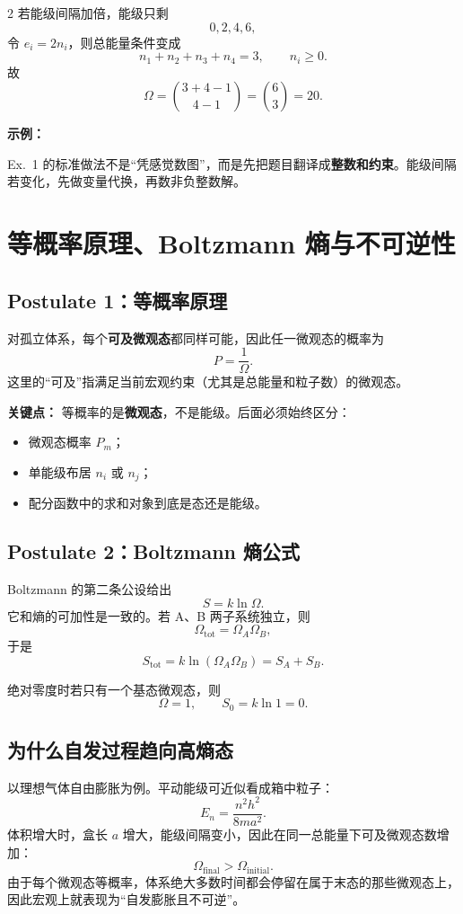 \documentclass[a4paper,9pt]{article}
\newenvironment{keypoint}
{\par\vspace{0.3em}\noindent\begin{tcolorbox}[
  colback=keybg,
  colframe=keycolor,
  boxrule=0.5pt,
  arc=2pt,
  left=2pt,
  right=2pt,
  top=2pt,
  bottom=2pt,
  boxsep=0pt,
  ]
\noindent\textcolor{keycolor}{\textbf{关键点：}}}
{\end{tcolorbox}\par\vspace{0.3em}}
\newenvironment{examplebox}
{\par\vspace{0.3em}\noindent\begin{tcolorbox}[
  colback=boxbg,
  colframe=derivcolor,
  boxrule=0.5pt,
  arc=2pt,
  left=2pt,
  right=2pt,
  top=2pt,
  bottom=2pt,
  boxsep=0pt,
  ]
\scriptsize\noindent\textcolor{derivcolor}{\textbf{示例：}}\par
\setlength{\parskip}{0.1ex}\setlength{\itemsep}{0pt}\setlength{\parsep}{0pt}}
{\end{tcolorbox}\par\vspace{0.3em}}
\begin{document}
\begin{multicols}{2}
	若能级间隔加倍，能级只剩
	\[
		0,2,4,6,
	\]
	令 $e_i=2n_i$，则总能量条件变成
	\[
		n_1+n_2+n_3+n_4=3,
		\qquad n_i\ge 0.
	\]
	故
	\[
		\Omega=\binom{3+4-1}{4-1}=\binom63=20.
	\]

	\begin{examplebox}
		Ex.~1 的标准做法不是“凭感觉数图”，而是先把题目翻译成\textbf{整数和约束}。能级间隔若变化，先做变量代换，再数非负整数解。
	\end{examplebox}

	\section{等概率原理、Boltzmann 熵与不可逆性}

	\subsection{Postulate 1：等概率原理}
	对孤立体系，每个\textbf{可及微观态}都同样可能，因此任一微观态的概率为
	\[
		P=\frac1\Omega.
	\]
	这里的“可及”指满足当前宏观约束（尤其是总能量和粒子数）的微观态。

	\begin{keypoint}
		等概率的是\textbf{微观态}，不是能级。后面必须始终区分：
		\begin{itemize}
			\item 微观态概率 $P_m$；
			\item 单能级布居 $n_i$ 或 $n_j$；
			\item 配分函数中的求和对象到底是态还是能级。
		\end{itemize}
	\end{keypoint}

	\subsection{Postulate 2：Boltzmann 熵公式}
	Boltzmann 的第二条公设给出
	\[
		S=k\ln\Omega.
	\]
	它和熵的可加性是一致的。若 A、B 两子系统独立，则
	\[
		\Omega_{\mathrm{tot}}=\Omega_A\Omega_B,
	\]
	于是
	\[
		S_{\mathrm{tot}}=k\ln(\Omega_A\Omega_B)=S_A+S_B.
	\]

	绝对零度时若只有一个基态微观态，则
	\[
		\Omega=1,
		\qquad S_0=k\ln 1=0.
	\]

	\subsection{为什么自发过程趋向高熵态}
	以理想气体自由膨胀为例。平动能级可近似看成箱中粒子：
	\[
		E_n=\frac{n^2h^2}{8ma^2}.
	\]
	体积增大时，盒长 $a$ 增大，能级间隔变小，因此在同一总能量下可及微观态数增加：
	\[
		\Omega_{\mathrm{final}}>\Omega_{\mathrm{initial}}.
	\]
	由于每个微观态等概率，体系绝大多数时间都会停留在属于末态的那些微观态上，因此宏观上就表现为“自发膨胀且不可逆”。


\end{multicols}
\end{document}
